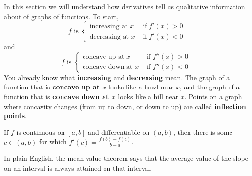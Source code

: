 In this section we will understand how derivatives tell us qualitative information about of graphs of functions. To start,
$$f \text{ is }
\begin{cases}\text{increasing at }x &\text{ if } f'(x)>0 \\ \text{decreasing at }x &\text{ if } f'(x)<0\end{cases}
$$
and
$$
f \text{ is }\begin{cases}\text{concave up at }x &\text{ if } f''(x)>0 \\ \text{concave down at }x &\text{ if } f''(x)<0.\end{cases}
$$
You already know what \textbf{increasing} and \textbf{decreasing} mean. The graph of a function that is \textbf{concave up at $x$} looks like a bowl near $x$, and the graph of a function that is \textbf{concave down at $x$} looks like a hill near $x$. Points on a graph where concavity changes (from up to down, or down to up) are called \textbf{inflection points}. 

\begin{thm}
If $f$ is continuous on $[a,b]$ and differentiable on $(a,b)$, then there is some $c\in (a,b)$ for which $f'(c)=\frac{f(b)-f(a)}{b-a}$.
\end{thm}

In plain English, the mean value theorem says that the average value of the slope on an interval is always attained on that interval.













